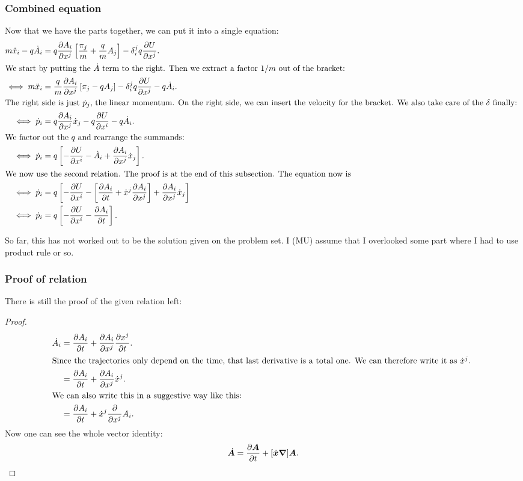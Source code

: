 \documentclass[11pt, english, fleqn, DIV=15, headinclude, BCOR=1cm]{scrartcl}
\begin{document}
\subsubsection{Combined equation}

Now that we have the parts together, we can put it into a single equation:
\begin{align*}
    m \ddot x_i - q \dot A_i &= 
    q \pd{A_i}{x^j}
    \sbr{\frac{\pi_j}m + \frac qm A_j}
    -
    \delta_i^j
    q \pd{U}{x^j}. \\
    \intertext{%
        We start by putting the $\dot A$ term to the right. Then we extract a
        factor $1/m$ out of the bracket:
    }
    \iff m \ddot x_i &= \frac qm \pd{A_i}{x^j} \sbr{\pi_j - q
    A_j} - \delta_i^j q \pd{U}{x^j} - q \dot A_i. \\
    \intertext{%
        The right side is just $\dot p_j$, the linear momentum. On the right
        side, we can insert the velocity for the bracket. We also take care of
        the $\delta$ finally:
    }
    \iff \dot p_i &= q \pd{A_i}{x^j} \dot x_j - q \pd{U}{x^i} - q \dot A_i. \\
    \intertext{%
        We factor out the $q$ and rearrange the summands:
    }
    \iff \dot p_i &= q \sbr{- \pd{U}{x^i} - \dot A_i + \pd{A_i}{x^j} \dot x_j}. \\
    \intertext{%
        We now use the second relation. The proof is at the end of this
        subsection. The equation now is
    }
    \iff \dot p_i &= q \sbr{- \pd{U}{x^i} - \sbr{\pd{A_i}t + \dot x^j
    \pd{A_i}{x^j}} + \pd{A_i}{x^j} \dot x_j} \\
    \iff \dot p_i &= q \sbr{- \pd{U}{x^i} - \pd{A_i}t}. \\
\end{align*}

\begin{warning}
    So far, this has not worked out to be the solution given on the problem
    set. I (MU) assume that I overlooked some part where I had to use product
    rule or so.
\end{warning}

\subsubsection{Proof of relation}

There is still the proof of the given relation left:
\begin{proof}
    \begin{align*}
        \dot A_i
        &= \pd{A_i}t + \pd{A_i}{x^j} \pd{x^j}{t}. \\
        \intertext{%
            Since the trajectories only depend on the time, that last
            derivative is a total one. We can therefore write it as $\dot x^j$.
        }
        &= \pd{A_i}t + \pd{A_i}{x^j} \dot x^j. \\
        \intertext{%
            We can also write this in a suggestive way like this:
        }
        &= \pd{A_i}t + \dot x^j \pd{}{x^j} A_i.
    \end{align*}
    Now one can see the whole vector identity:
    \[
        \dot{\boldsymbol{A}} = \frac{\partial {\boldsymbol{A}}}{\partial {t}} + [\dot{\boldsymbol{x}} \boldsymbol{\nabla}] \boldsymbol{A}.
    \]
\end{proof}
\end{document}
